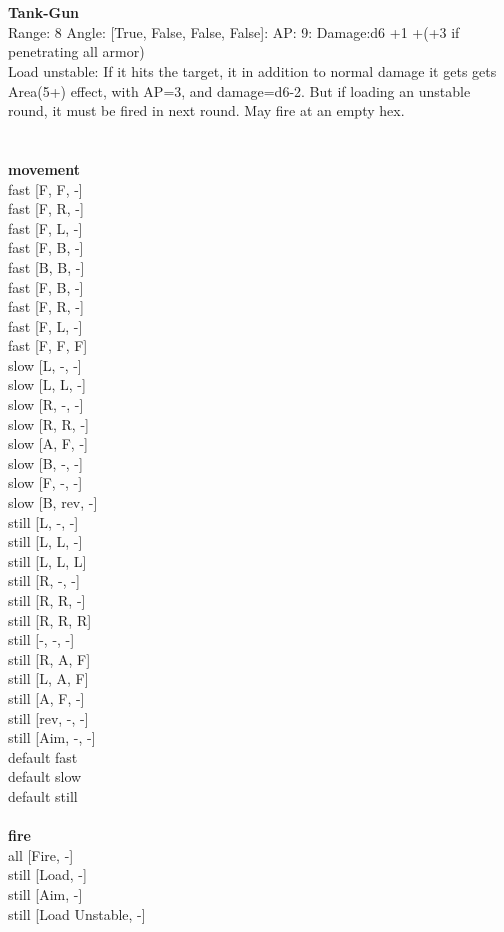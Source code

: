 \ \\

\ \\
{\bf Tank-Gun } \\



Range: 8  Angle: [True, False, False, False]: AP: 9: Damage:d6 +1 +(+3 if penetrating all armor) \\
Load unstable: If it hits the target, it in addition to normal damage it gets gets Area(5+) effect, with AP=3, and damage=d6-2. But if loading an unstable round, it must be fired in next round. May fire at an empty hex.\\ 




 
\ \\



\ \\ {\bf movement } \\
fast [F, F, -] \\
fast [F, R, -] \\
fast [F, L, -] \\
fast [F, B, -] \\
fast [B, B, -] \\
fast [F, B, -] \\
fast [F, R, -] \\
fast [F, L, -] \\
fast [F, F, F] \\
slow [L, -, -] \\
slow [L, L, -] \\
slow [R, -, -] \\
slow [R, R, -] \\
slow [A, F, -] \\
slow [B, -, -] \\
slow [F, -, -] \\
slow [B, rev, -] \\
still [L, -, -] \\
still [L, L, -] \\
still [L, L, L] \\
still [R, -, -] \\
still [R, R, -] \\
still [R, R, R] \\
still [-, -, -] \\
still [R, A, F] \\
still [L, A, F] \\
still [A, F, -] \\
still [rev, -, -] \\
still [Aim, -, -] \\
default fast \\
default slow \\
default still \\
\ \\ {\bf fire } \\
all [Fire, -] \\
still [Load, -] \\
still [Aim, -] \\
still [Load Unstable, -] \\


